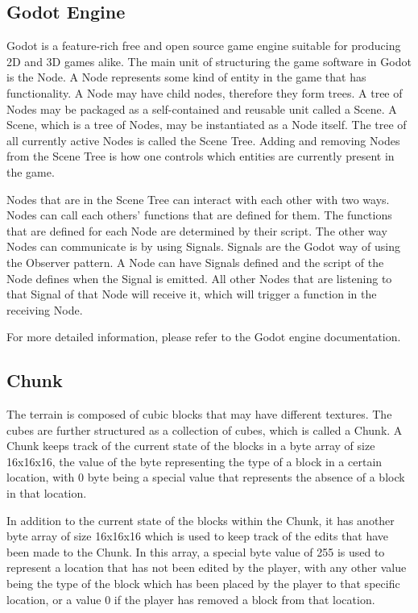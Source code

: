\documentclass{report}
\begin{document}
\subsection{Godot Engine}
Godot is a feature-rich free and open source game engine suitable for producing 2D and 3D games alike. The main unit of structuring the game software in Godot is the Node. A Node represents some kind of entity in the game that has functionality. A Node may have child nodes, therefore they form trees. A tree of Nodes may be packaged as a self-contained and reusable unit called a Scene. A Scene, which is a tree of Nodes, may be instantiated as a Node itself. The tree of all currently active Nodes is called the Scene Tree. Adding and removing Nodes from the Scene Tree is how one controls which entities are currently present in the game.\par
Nodes that are in the Scene Tree can interact with each other with two ways. Nodes can call each others' functions that are defined for them. The functions that are defined for each Node are determined by their script. The other way Nodes can communicate is by using Signals. Signals are the Godot way of using the Observer pattern. A Node can have Signals defined and the script of the Node defines when the Signal is emitted. All other Nodes that are listening to that Signal of that Node will receive it, which will trigger a function in the receiving Node.\par
For more detailed information, please refer to the Godot engine documentation\cite{godotdocs}.
\subsection{Chunk}
The terrain is composed of cubic blocks that may have different textures. The cubes are further structured as a collection of cubes, which is called a Chunk. A Chunk keeps track of the current state of the blocks in a byte array of size 16x16x16, the value of the byte representing the type of a block in a certain location, with 0 byte being a special value that represents the absence of a block in that location.\par
In addition to the current state of the blocks within the Chunk, it has another byte array of size 16x16x16 which is used to keep track of the edits that have been made to the Chunk. In this array, a special byte value of 255 is used to represent a location that has not been edited by the player, with any other value being the type of the block which has been placed by the player to that specific location, or a value 0 if the player has removed a block from that location.
\end{document}
